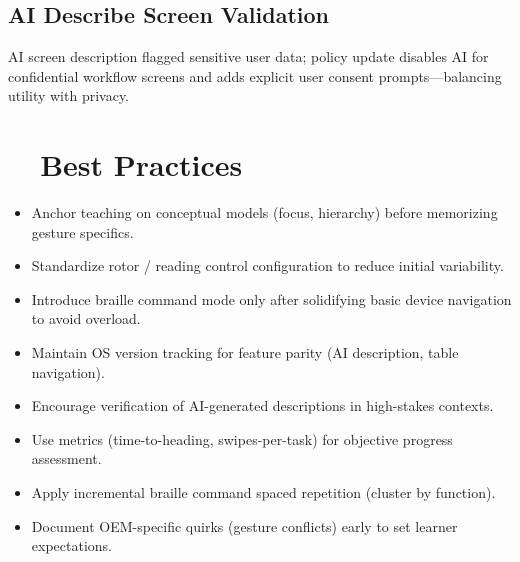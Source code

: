 \subsection*{AI Describe Screen Validation}
AI screen description flagged sensitive user data; policy update disables AI for confidential workflow screens and adds explicit user consent prompts—balancing utility with privacy.

\section{~~Best Practices}
\label{sec:sr26-best-practices}
\begin{itemize}
	\item Anchor teaching on conceptual models (focus, hierarchy) before memorizing gesture specifics.
	\item Standardize rotor / reading control configuration to reduce initial variability.
	\item Introduce braille command mode only after solidifying basic device navigation to avoid overload.
	\item Maintain OS version tracking for feature parity (AI description, table navigation).
	\item Encourage verification of AI-generated descriptions in high-stakes contexts.
	\item Use metrics (time-to-heading, swipes-per-task) for objective progress assessment.
	\item Apply incremental braille command spaced repetition (cluster by function).
	\item Document OEM-specific quirks (gesture conflicts) early to set learner expectations.
\end{itemize}

